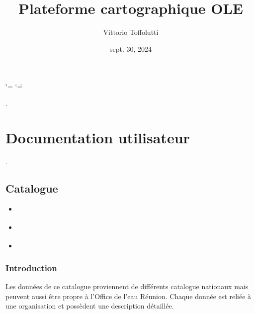 \documentclass[letterpaper,10pt,french]{sphinxmanual}
\title{Plateforme cartographique OLE}
\date{sept. 30, 2024}
\author{Vittorio Toffolutti}
\begin{document}
\ifdefined\shorthandoff
  \ifnum\catcode`\=\string=\active\shorthandoff{=}\fi
  \ifnum\catcode`\"=\active{}\fi
\fi

\pagestyle{empty}
\sphinxmaketitle
\pagestyle{plain}
\sphinxtableofcontents
\pagestyle{normal}
\label{\detokenize{index::doc}}


\sphinxAtStartPar
{}.

\sphinxstepscope


\chapter{Documentation utilisateur}
\label{\detokenize{doc_user:documentation-utilisateur}}\label{\detokenize{doc_user::doc}}
\sphinxAtStartPar
{}.

\sphinxstepscope


\section{Catalogue}
\label{\detokenize{doc_user/catalogue:catalogue}}\label{\detokenize{doc_user/catalogue::doc}}
\begin{sphinxShadowBox}
\begin{itemize}
\item {} 
\sphinxAtStartPar
{}\label{\detokenize{doc_user/catalogue:id1}}{\hyperref[\detokenize{doc_user/catalogue:introduction}]{}}

\item {} 
\sphinxAtStartPar
{}\label{\detokenize{doc_user/catalogue:id2}}{\hyperref[\detokenize{doc_user/catalogue:la-recherche-des-donnees-dans-le-catalogue}]{}}

\item {} 
\sphinxAtStartPar
{}\label{\detokenize{doc_user/catalogue:id3}}{\hyperref[\detokenize{doc_user/catalogue:les-fonctionnalites-des-fiches-de-donnees}]{}}

\end{itemize}
\end{sphinxShadowBox}


\subsection{Introduction}
\label{\detokenize{doc_user/catalogue:introduction}}
\sphinxAtStartPar
Les données de ce catalogue proviennent de différents catalogue nationaux mais peuvent aussi être propre à l’Office de l’eau Réunion.
Chaque donnée est reliée à une organisation et possèdent une description détaillée.
\end{document}
